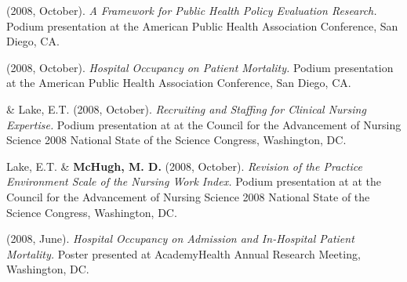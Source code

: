 \documentclass[10pt,]{article}
\begin{document}
{{{{{{{{{{{{{{{\begin{hangparas}{.25in}{1}
\end{hangparas}

\vspace{4mm}

\begin{hangparas}{.25in}{1}

 (2008, October). {\textit {A Framework for Public Health Policy Evaluation Research.}} Podium presentation at the American Public Health Association Conference, San Diego, CA.

\end{hangparas}

\vspace{4mm}

\begin{hangparas}{.25in}{1}

 (2008, October). {\textit {Hospital Occupancy on Patient Mortality.}} Podium presentation at the American Public Health Association Conference, San Diego, CA.

\end{hangparas}

\vspace{4mm}

\begin{hangparas}{.25in}{1}

 \& Lake, E.T. (2008, October). {\textit {Recruiting and Staffing for Clinical Nursing Expertise.}} Podium presentation at at the Council for the Advancement of Nursing Science 2008 National State of the Science Congress, Washington, DC.

\end{hangparas}

\vspace{4mm}

\begin{hangparas}{.25in}{1}

\*Lake, E.T. \& {\textbf {McHugh, M. D.}} (2008, October). {\textit {Revision of the Practice Environment Scale of the Nursing Work Index.}} Podium presentation at at the Council for the Advancement of Nursing Science 2008 National State of the Science Congress, Washington, DC.

\end{hangparas}

\vspace{4mm}

\begin{hangparas}{.25in}{1}

 (2008, June). {\textit {Hospital Occupancy on Admission and In-Hospital Patient Mortality.}} Poster presented at AcademyHealth Annual Research Meeting, Washington, DC.


\end{hangparas}}}}}}}}}}}}}}}}
\end{document}
